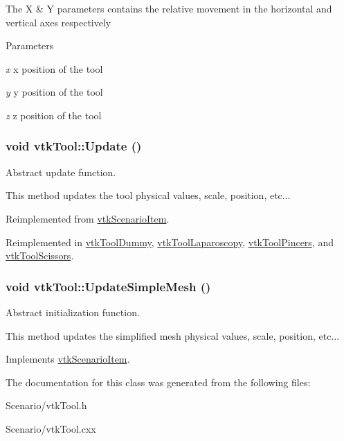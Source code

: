 The X \& Y parameters contains the relative movement in the horizontal and vertical axes respectively 
\begin{DoxyParams}{Parameters}
\item[{\em x}]x position of the tool \item[{\em y}]y position of the tool \item[{\em z}]z position of the tool \end{DoxyParams}
\hypertarget{classvtkTool_a0f1b6e049d7ff5420f4f4604434a9da7}{
\subsubsection[{Update}]{\setlength{\rightskip}{0pt plus 5cm}void vtkTool::Update ()}}
\label{classvtkTool_a0f1b6e049d7ff5420f4f4604434a9da7}


Abstract update function. 

This method updates the tool physical values, scale, position, etc... 

Reimplemented from \hyperlink{classvtkScenarioItem_ad29b7f2958399100f919b4eb9627fbc1}{vtkScenarioItem}.



Reimplemented in \hyperlink{classvtkToolDummy_a19cda726ffda0a3955e519d7b42e4882}{vtkToolDummy}, \hyperlink{classvtkToolLaparoscopy_a4445a0cfabd77b50a06929b04cb71f9e}{vtkToolLaparoscopy}, \hyperlink{classvtkToolPincers_a57986aee2bcfa04472410cd7bf5c7929}{vtkToolPincers}, and \hyperlink{classvtkToolScissors_afe574b6b9e809f746308a157b6525c4b}{vtkToolScissors}.

\hypertarget{classvtkTool_ac44896d171f0512b821f7ab031f7fed7}{
\subsubsection[{UpdateSimpleMesh}]{\setlength{\rightskip}{0pt plus 5cm}void vtkTool::UpdateSimpleMesh ()}}
\label{classvtkTool_ac44896d171f0512b821f7ab031f7fed7}


Abstract initialization function. 

This method updates the simplified mesh physical values, scale, position, etc... 

Implements \hyperlink{classvtkScenarioItem_a75b837f36e8f79f51999dc1a7eecbe4b}{vtkScenarioItem}.



The documentation for this class was generated from the following files:\begin{DoxyCompactItemize}
\item 
Scenario/vtkTool.h\item 
Scenario/vtkTool.cxx\end{DoxyCompactItemize}
